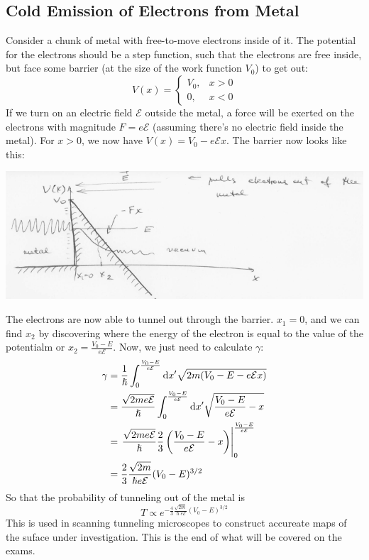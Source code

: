 \documentclass[a4paper]{article}
\begin{document}
\subsection{Cold Emission of Electrons from Metal}
Consider a chunk of metal with free-to-move electrons inside of it. The
potential for the electrons should be a step function, such that the electrons
are free inside, but face some barrier (at the size of the work function $V_0$)
to get out:
\[
	V(x) = \begin{cases}
		V_0, & x>0\\
		0,   & x<0
	\end{cases}
\]
If we turn on an electric field $\mathcal{E}$
outside the metal, a force will be exerted
on the electrons with magnitude $F=e\mathcal{E}$
(assuming there's no electric field inside the metal). For $x>0$, we now have
$V(x) = V_0-e\mathcal{E}x$.
The barrier now looks like this:
\begin{center}
	\includegraphics[width=\textwidth]{E_WKB.png}
\end{center}
The electrons are now able to tunnel out through the barrier. $x_1=0$, and
we can find $x_2$ by discovering where the energy of the electron is equal to
the value of the potentialm or $x_2 = \frac{V_0-E}{e\mathcal{E}}$.
Now, we just need to calculate $\gamma$:
\begin{align*}
	\gamma &= \frac{1}{\hslash}\int_0^{\frac{V_0-E}{e\mathcal{E}}}\mathrm{d} x'
	\sqrt{2m(V_0-E-e\mathcal{E}x)}\\
	&= \frac{\sqrt{2me\mathcal{E}}}{\hslash}
	\int_0^{\frac{V_0-E}{e\mathcal{E}}}\mathrm{d}
	x'\sqrt{\frac{V_0-E}{e\mathcal{E}} - x}\\
	&= \left.\frac{\sqrt{2me\mathcal{E}}}{\hslash}\frac{2}{3} \left(
		\frac{V_0-E}{e\mathcal{E}}-x
	\right)\right|_{0}^{\frac{V_0-E}{e\mathcal{E}}}\\
	&= \frac{2}{3}\frac{\sqrt{2m}}{\hslash e\mathcal{E}}(V_0-E)^{3/2}
\end{align*}
So that the probability of tunneling out of the metal is
\[
	T \propto e^{-\frac{4}{3}\frac{\sqrt{2m}}{\hslash e\mathcal{E}}
	(V_0-E)^{3/2}}
\]
This is used in scanning tunneling microscopes to construct accureate maps of
the suface under investigation. This is the end of what will be covered on the
exams.
\end{document}
